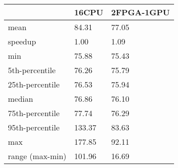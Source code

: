 \begin{tabular}{lll}
\toprule
 & 16CPU & 2FPGA-1GPU \\
\midrule
mean & 84.31 & 77.05 \\
speedup & 1.00 & 1.09 \\
min & 75.88 & 75.43 \\
5th-percentile & 76.26 & 75.79 \\
25th-percentile & 76.53 & 75.94 \\
median & 76.86 & 76.10 \\
75th-percentile & 77.74 & 76.29 \\
95th-percentile & 133.37 & 83.63 \\
max & 177.85 & 92.11 \\
range (max-min) & 101.96 & 16.69 \\
\bottomrule
\end{tabular}

